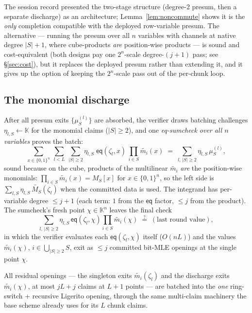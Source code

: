 \documentclass[11pt]{article}
\newcommand{\K}{\mathbb{K}}            %
\newcommand{\bits}{\{0,1\}}
\newcommand{\mle}[1]{\widetilde{#1}}
\newcommand{\eq}{\mathsf{eq}}
\theoremstyle{plain}
\theoremstyle{definition}
\theoremstyle{remark}
\begin{document}
The session record presented the two-stage structure (degree-2 presum, then a
separate discharge) as an architecture; Lemma~\ref{lem:noncommute} shows it is
the \emph{only} completion compatible with the deployed row-variable presum.
The alternative --- running the presum over all $n$ variables with channels
at native degree $|S|+1$, where cube-products \emph{are} position-wise
products --- is sound and cost-equivalent (both designs pay one
$2^{n}$-scale degree-$(j{+}1)$ pass; see \S\ref{sec:cost}), but it replaces
the deployed presum rather than extending it, and it gives up the option of
keeping the $2^{n}$-scale pass out of the per-chunk loop.

\subsection{The monomial discharge}\label{sec:discharge}

After all presum exits $\{\mu^{(l)}_S\}$ are absorbed, the verifier draws
batching challenges $\eta_{l,S}\gets\K$ for the monomial claims
($|S|\ge 2$), and one \emph{eq-sumcheck over all $n$ variables} proves the
batch:
\begin{equation}\label{eq:discharge}
  \sum_{x\in\bits^{n}}\
  \sum_{l<L}\ \sum_{|S|\ge 2} \eta_{l,S}\;
     \eq(\zeta_l, x)\,\prod_{i\in S}\mle{m_i}(x)
  \;=\;
  \sum_{l,\,|S|\ge2} \eta_{l,S}\,\mu^{(l)}_S ,
\end{equation}
sound because on the cube, products of the multilinear $\mle{m_i}$ \emph{are}
the position-wise monomials: $\prod_{i\in S}\mle{m_i}(x) = M_S[x]$ for
$x\in\bits^{n}$, so the left side is
$\sum_{l,S}\eta_{l,S}\,\mle{M_S}(\zeta_l)$ when the committed data is used.
The integrand has per-variable degree $\le j+1$ (each term: $1$ from the
$\eq$ factor, $\le j$ from the product). The sumcheck's fresh point
$\chi\in\K^{n}$ leaves the final check
\[
  \sum_{l,\,|S|\ge2}\eta_{l,S}\,\eq(\zeta_l,\chi)
     \prod_{i\in S}\mle{m_i}(\chi)
  \;\stackrel{?}{=}\; (\text{last round value}),
\]
in which the verifier evaluates each $\eq(\zeta_l,\chi)$ itself ($O(nL)$) and
the values $\mle{m_i}(\chi)$, $i\in\bigcup_{|S|\ge2}S$, exit as $\le j$
committed bit-MLE openings at the single point $\chi$.

All residual openings --- the singleton exits $\mle{m_i}(\zeta_l)$ and the
discharge exits $\mle{m_i}(\chi)$, at most $jL + j$ claims at $L+1$ points ---
are batched into the \emph{one} ring-switch + recursive Ligerito opening,
through the same multi-claim machinery the base scheme already uses for its
$L$ chunk claims.
\end{document}
